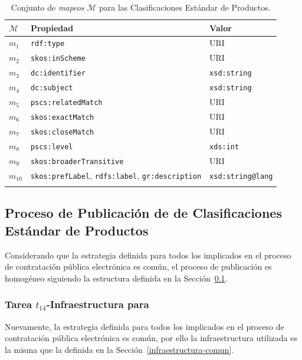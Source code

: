 \begin{longtable}[c]{|p{2cm}|p{8cm}|p{4cm}|} 
\hline
  \textbf{$\mathcal{M}$} &  \textbf{Propiedad} & \textbf{Valor} \\\hline
\endhead
 $m_1$ & \texttt{rdf:type} & \gls{URI} \\ \hline
 $m_2$ & \texttt{skos:inScheme} & URI  \\ \hline
 $m_3$ & \texttt{dc:identifier} & \texttt{xsd:string} \\ \hline
 $m_4$ & \texttt{dc:subject} & \texttt{xsd:string} \\ \hline
 $m_5$ & \texttt{pscs:relatedMatch} & URI  \\ \hline
 $m_6$ & \texttt{skos:exactMatch } & URI \\ \hline
 $m_7$ & \texttt{skos:closeMatch } & URI  \\ \hline
 $m_8$ & \texttt{pscs:level} & \texttt{xds:int} \\ \hline  
 $m_9$ & \texttt{skos:broaderTransitive} & URI \\ \hline
 $m_{10}$ & \texttt{skos:prefLabel}, \texttt{rdfs:label}, \texttt{gr:description}  & \texttt{xsd:string@lang} \\ \hline   
\hline
\caption{Conjunto de \textit{mapeos} $\mathcal{M}$ para las Clasificaciones Estándar de Productos.}\label{table:pscs-mappings}\\    
\end{longtable}

\subsection{Proceso de Publicación de \linkeddata de Clasificaciones\\ Estándar de Productos}\label{sect:proceso-publicacion-ld}
Considerando que la estrategia definida para todos los \datasets implicados en el proceso de contratación pública 
electrónica es común, el proceso de publicación es homogéneo siguiendo la estructura definida 
en la Sección~\ref{sect:proceso-publicacion-ld}.

\newpage

\subsubsection{Tarea $t_{14}$-Infraestructura para \linkeddata}
Nuevamente, la estrategia definida para todos los \datasets implicados en el proceso de contratación pública 
electrónica es común, por ello la infraestructura utilizada es la misma que la definida 
en la Sección~\ref{infraestructura-comun}.

